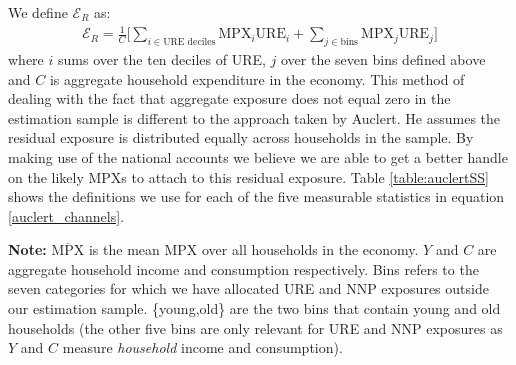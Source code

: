 \documentclass[titlepage]{\econtex}\newcommand{\texname}{ConsumptionHeterogeneity}
\begin{document}
We define $\mathcal{E}_R$ as:
\begin{align}
\mathcal{E}_R = \frac{1}{C}\Bigg[ \sum_{i \in \text{URE deciles} } \text{MPX}_i \text{URE}_i + \sum_{j \in \text{bins}} \text{MPX}_j \text{URE}_j \Bigg]
\end{align}
where $i$ sums over the ten deciles of URE, $j$ over the seven bins defined above and $C$ is aggregate household expenditure in the economy. This method of dealing with the fact that aggregate exposure does not equal zero in the estimation sample is different to the approach taken by Auclert. He assumes the residual exposure is distributed equally across households in the sample. By making use of the national accounts we believe we are able to get a better handle on the likely MPXs to attach to this residual exposure. Table \ref{table:auclertSS} shows the definitions we use for each of the five measurable statistics in equation \ref{auclert_channels}.

\begin{minipage}{1.0\textwidth}
	\begin{center}
		\label{table:auclertSS}
	\end{center}
	\tiny \textbf{Note: } $\overline{\text{MPX}}$ is the mean MPX over all households in the economy. $Y$ and $C$ are aggregate household income and consumption respectively. Bins refers to the seven categories for which we have allocated URE and NNP exposures outside our estimation sample. \{young,old\} are the two bins that contain young and old households (the other five bins are only relevant for URE and NNP exposures as $Y$ and $C$ measure \textit{household} income and consumption).
\end{minipage}
\end{document}

